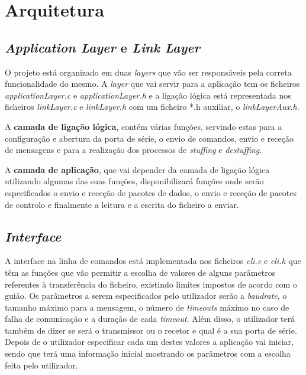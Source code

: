 \documentclass[11pt]{article}
\begin{document}
\section{Arquitetura}

\subsection{\textit{Application Layer} e \textit{Link Layer}}

O projeto está organizado em duas \textit{layers} que vão ser responsáveis pela correta funcionalidade do mesmo. A \textit{layer} que vai servir para a aplicação tem os ficheiros \textit{applicationLayer.c} e \textit{applicationLayer.h} e a ligação lógica está representada nos ficheiros \textit{linkLayer.c} e \textit{linkLayer.h} com um ficheiro *.h auxiliar, o \textit{linkLayerAux.h}.\newline

A \textbf{camada de ligação lógica}, contém várias funções, servindo estas para a configuração e abertura da porta de série, o envio de comandos, envio e receção de mensagens e para a realização dos processos de \textit{stuffing} e \textit{destuffing}.\newline

A \textbf{camada de aplicação}, que vai depender da camada de ligação lógica utilizando algumas das suas funções, disponibilizará funções onde serão especificados o envio e receção de pacotes de dados, o envio e receção de pacotes de controlo e finalmente a leitura e a escrita do ficheiro a enviar. 

\subsection{\textit{Interface}}

A interface na linha de comandos está implementada nos ficheiros \textit{cli.c} e \textit{cli.h} que têm as funções que vão permitir a escolha de valores de alguns parâmetros referentes à transferência do ficheiro, existindo limites impostos de acordo com o guião. 
Os parâmetros a serem especificados pelo utilizador serão a \textit{baudrate}, o tamanho máximo para a mensagem, o número de \textit{timeouts} máximo no caso de falha de comunicação e a duração de cada \textit{timeout}. Além disso, o utilizador terá também de dizer se será o transmissor ou o recetor e qual é a sua porta de série. Depois de o utilizador especificar cada um destes valores a aplicação vai iniciar, sendo que terá uma informação inicial mostrando os parâmetros com a escolha feita pelo utilizador. \linebreak
\end{document}
